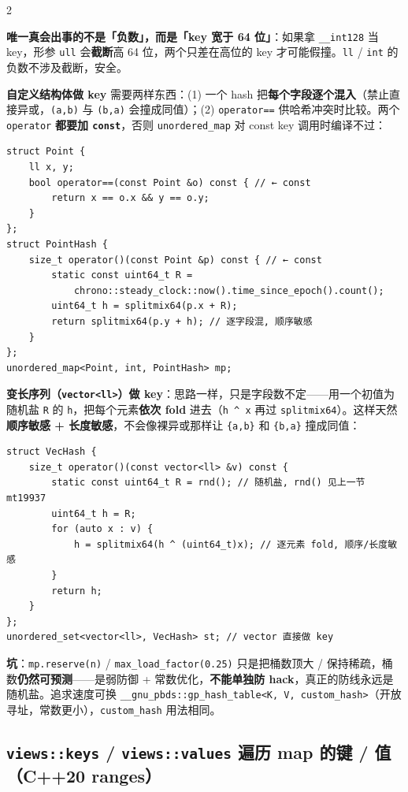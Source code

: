 \begin{multicols*}{2}
\begin{mentor}
\textbf{唯一真会出事的不是「负数」，而是「key 宽于 64 位」}：如果拿 \texttt{\_\_int128} 当 key，形参 \texttt{ull} 会\textbf{截断}高 64 位，两个只差在高位的 key 才可能假撞。\texttt{ll} / \texttt{int} 的负数不涉及截断，安全。
		\end{mentor}

		\textbf{自定义结构体做 key} 需要两样东西：(1) 一个 hash 把\textbf{每个字段逐个混入}（禁止直接异或，\texttt{(a,b)} 与 \texttt{(b,a)} 会撞成同值）；(2) \texttt{operator==} 供哈希冲突时比较。两个 \texttt{operator} \textbf{都要加 \texttt{const}}，否则 \texttt{unordered\_map} 对 const key 调用时编译不过：

		\begin{verbatim}
struct Point {
	ll x, y;
	bool operator==(const Point &o) const { // ← const
		return x == o.x && y == o.y;
	}
};
struct PointHash {
	size_t operator()(const Point &p) const { // ← const
		static const uint64_t R =
			chrono::steady_clock::now().time_since_epoch().count();
		uint64_t h = splitmix64(p.x + R);
		return splitmix64(p.y + h); // 逐字段混, 顺序敏感
	}
};
unordered_map<Point, int, PointHash> mp;
		\end{verbatim}

		\textbf{变长序列（\texttt{vector<ll>}）做 key}：思路一样，只是字段数不定——用一个初值为随机盐 \texttt{R} 的 \texttt{h}，把每个元素\textbf{依次 fold} 进去（\texttt{h \^{} x} 再过 \texttt{splitmix64}）。这样天然\textbf{顺序敏感 + 长度敏感}，不会像裸异或那样让 \texttt{\{a,b\}} 和 \texttt{\{b,a\}} 撞成同值：

		\begin{verbatim}
struct VecHash {
	size_t operator()(const vector<ll> &v) const {
		static const uint64_t R = rnd(); // 随机盐, rnd() 见上一节 mt19937
		uint64_t h = R;
		for (auto x : v) {
			h = splitmix64(h ^ (uint64_t)x); // 逐元素 fold, 顺序/长度敏感
		}
		return h;
	}
};
unordered_set<vector<ll>, VecHash> st; // vector 直接做 key
		\end{verbatim}

		\textbf{坑}：\texttt{mp.reserve(n)} / \texttt{max\_load\_factor(0.25)} 只是把桶数顶大 / 保持稀疏，桶数\textbf{仍然可预测}——是弱防御 + 常数优化，\textbf{不能单独防 hack}，真正的防线永远是随机盐。追求速度可换 \texttt{\_\_gnu\_pbds::gp\_hash\_table<K, V, custom\_hash>}（开放寻址，常数更小），\texttt{custom\_hash} 用法相同。

		\subsection{\texttt{views::keys} / \texttt{views::values} 遍历 map 的键 / 值（C++20 ranges）}


\end{multicols*}
